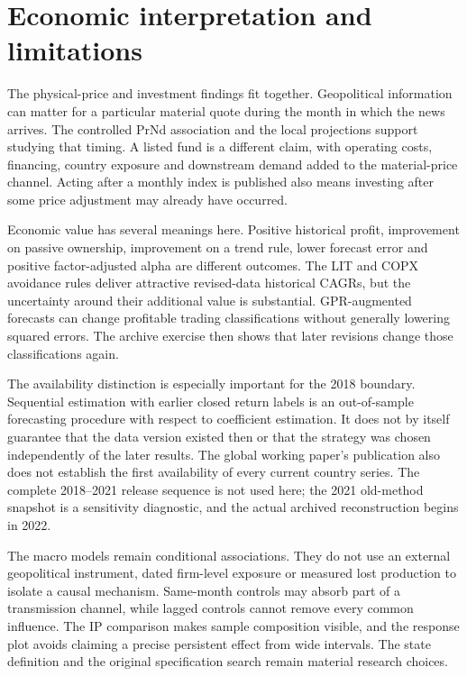 \section{Economic interpretation and limitations}

The physical-price and investment findings fit together. Geopolitical information can matter for a particular material quote during the month in which the news arrives. The controlled PrNd association and the local projections support studying that timing. A listed fund is a different claim, with operating costs, financing, country exposure and downstream demand added to the material-price channel. Acting after a monthly index is published also means investing after some price adjustment may already have occurred.

Economic value has several meanings here. Positive historical profit, improvement on passive ownership, improvement on a trend rule, lower forecast error and positive factor-adjusted alpha are different outcomes. The LIT and COPX avoidance rules deliver attractive revised-data historical CAGRs, but the uncertainty around their additional value is substantial. GPR-augmented forecasts can change profitable trading classifications without generally lowering squared errors. The archive exercise then shows that later revisions change those classifications again.

The availability distinction is especially important for the 2018 boundary. Sequential estimation with earlier closed return labels is an out-of-sample forecasting procedure with respect to coefficient estimation. It does not by itself guarantee that the data version existed then or that the strategy was chosen independently of the later results. The global working paper's publication also does not establish the first availability of every current country series. The complete 2018–2021 release sequence is not used here; the 2021 old-method snapshot is a sensitivity diagnostic, and the actual archived reconstruction begins in 2022.

The macro models remain conditional associations. They do not use an external geopolitical instrument, dated firm-level exposure or measured lost production to isolate a causal mechanism. Same-month controls may absorb part of a transmission channel, while lagged controls cannot remove every common influence. The IP comparison makes sample composition visible, and the response plot avoids claiming a precise persistent effect from wide intervals. The state definition and the original specification search remain material research choices.

